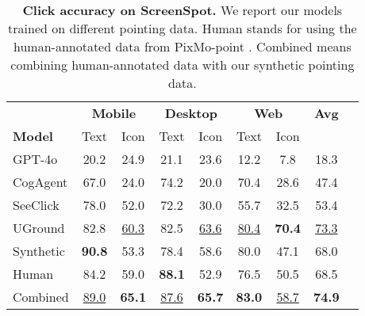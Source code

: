 \begin{table}[!t]
    \centering
    \small
    \setlength{\tabcolsep}{4pt}
    \begin{tabular}{lcccccccc}
        \toprule
        & \multicolumn{2}{c}{\textbf{Mobile}} & \multicolumn{2}{c}{\textbf{Desktop}} & \multicolumn{2}{c}{\textbf{Web}} & \textbf{Avg} \\
        \cmidrule(lr){2-3} \cmidrule(lr){4-5} \cmidrule(lr){6-7}
        \textbf{Model} & Text & Icon & Text & Icon & Text & Icon & \\
        \midrule
        GPT-4o & 20.2 & 24.9 & 21.1 & 23.6 & 12.2 & 7.8 & 18.3 \\
        CogAgent & 67.0 & 24.0 & 74.2 & 20.0 & 70.4 & 28.6 & 47.4 \\
        SeeClick & 78.0 & 52.0 & 72.2 & 30.0 & 55.7 & 32.5 & 53.4 \\
        UGround & 82.8 & \underline{60.3} & 82.5 & \underline{63.6} & \underline{80.4} & \textbf{70.4} & \underline{73.3} \\ \midrule
        Synthetic & \textbf{90.8} & 53.3 & 78.4 & 58.6 & 80.0 & 47.1 & 68.0 \\
        Human & 84.2 & 59.0 & \textbf{88.1} & 52.9 & 76.5 & 50.5 & 68.5 \\
        \cellcolor{gray!10}Combined & \cellcolor{gray!10}\underline{89.0} & \cellcolor{gray!10}\textbf{65.1} & \cellcolor{gray!10}\underline{87.6} & \cellcolor{gray!10}\textbf{65.7} & \cellcolor{gray!10}\textbf{83.0} & \cellcolor{gray!10}\underline{58.7} & \cellcolor{gray!10}\textbf{74.9} \\
        \bottomrule
    \end{tabular}
    \caption{\textbf{Click accuracy on ScreenSpot.} We report our models trained on different pointing data. Human stands for using the human-annotated data from PixMo-point \cite{deitke2024molmo}. Combined means combining human-annotated data with our synthetic pointing data.}
    \label{tab:click}
    \vspace{-.3cm}
\end{table}